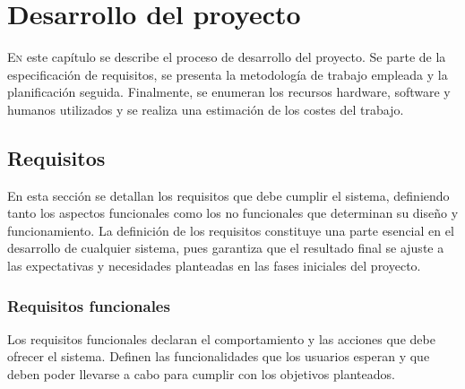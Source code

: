 \chapter{Desarrollo del proyecto}
\label{chap:desarrollo}

\lettrine{E}{n} este capítulo se describe el proceso de desarrollo del proyecto. Se parte de la especificación de requisitos, %
se presenta la metodología de trabajo empleada y la planificación seguida.
Finalmente, se enumeran los recursos hardware, software y humanos utilizados y se realiza una estimación de los costes del trabajo.

\section{Requisitos}
\label{sec:requisitos}

En esta sección se detallan los requisitos que debe cumplir el sistema, definiendo tanto los aspectos funcionales como los no funcionales que determinan su diseño y funcionamiento. La definición de los requisitos constituye una parte esencial en el desarrollo de cualquier sistema, pues garantiza que el resultado final se ajuste a las expectativas y necesidades planteadas en las fases iniciales del proyecto.

\subsection{Requisitos funcionales}

Los requisitos funcionales declaran el comportamiento y las acciones que debe ofrecer el sistema. Definen las funcionalidades que los usuarios esperan y que deben poder llevarse a cabo para cumplir con los objetivos planteados.

